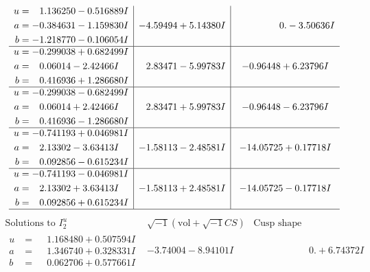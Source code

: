 \documentclass[1p]{elsarticle_modified}
\theoremstyle{definition}
\newcommand{\I}{\sqrt{-1}}
\begin{document}
$$\begin{array}{c|c|c}
\begin{aligned}
u &= \phantom{-}1.136250 - 0.516889 I \\
a &= -0.384631 - 1.159830 I \\
b &= -1.218770 - 0.106054 I\end{aligned}
 & -4.59494 + 5.14380 I & \phantom{-0.000000 } 0. - 3.50636 I \\ \hline\begin{aligned}
u &= -0.299038 + 0.682499 I \\
a &= \phantom{-}0.06014 - 2.42466 I \\
b &= \phantom{-}0.416936 + 1.286680 I\end{aligned}
 & \phantom{-}2.83471 - 5.99783 I & -0.96448 + 6.23796 I \\ \hline\begin{aligned}
u &= -0.299038 - 0.682499 I \\
a &= \phantom{-}0.06014 + 2.42466 I \\
b &= \phantom{-}0.416936 - 1.286680 I\end{aligned}
 & \phantom{-}2.83471 + 5.99783 I & -0.96448 - 6.23796 I \\ \hline\begin{aligned}
u &= -0.741193 + 0.046981 I \\
a &= \phantom{-}2.13302 - 3.63413 I \\
b &= \phantom{-}0.092856 - 0.615234 I\end{aligned}
 & -1.58113 - 2.48581 I & -14.05725 + 0.17718 I \\ \hline\begin{aligned}
u &= -0.741193 - 0.046981 I \\
a &= \phantom{-}2.13302 + 3.63413 I \\
b &= \phantom{-}0.092856 + 0.615234 I\end{aligned}
 & -1.58113 + 2.48581 I & -14.05725 - 0.17718 I\\
 \hline 
 \end{array}$$\newpage$$\begin{array}{c|c|c}  
\text{Solutions to }I^u_{2}& \I (\text{vol} + \sqrt{-1}CS) & \text{Cusp shape}\\
 \hline 
\begin{aligned}
u &= \phantom{-}1.168480 + 0.507594 I \\
a &= \phantom{-}1.346740 + 0.328331 I \\
b &= \phantom{-}0.062706 + 0.577661 I\end{aligned}
 & -3.74004 - 8.94101 I & \phantom{-0.000000 -}0. + 6.74372 I \\ \hline\begin{aligned}

\end{aligned}
\end{array}$$
\end{document}
